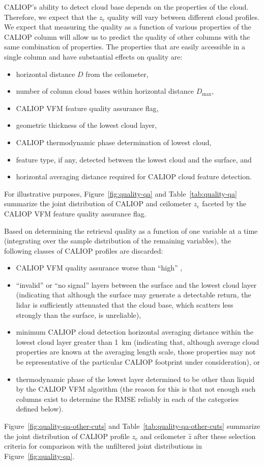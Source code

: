 \documentclass[essd,manuscript]{copernicus}\usepackage[]{graphicx}\usepackage[]{color}
\newcommand\CBHc{\ensuremath{z_\text{c}}}
\begin{document}
CALIOP's ability to detect cloud base depends on the properties of the cloud.
Therefore, we expect that the \CBHc{} quality will vary between
different cloud profiles.  We expect that measuring the quality as a function of various
properties of the CALIOP column will allow us to predict the quality of other
columns with the same combination of properties.  The properties that are easily
accessible in a single column and have substantial effects on quality are:
\begin{itemize}
\item horizontal distance $D$ from the ceilometer,
\item number of column cloud bases within horizontal distance $D_\text{max}$,
\item CALIOP VFM feature quality assurance flag,
\item geometric thickness of the lowest cloud layer,
\item CALIOP thermodynamic phase determination of lowest cloud,
\item feature type, if any, detected between the lowest cloud and the surface, and
\item horizontal averaging distance required for CALIOP cloud feature
  detection.
\end{itemize}
For illustrative purposes, Figure~\ref{fig:quality-qa} and
Table~\ref{tab:quality-qa} summarize the joint distribution of CALIOP and
ceilometer \CBHc{} faceted by the CALIOP VFM feature quality assurance flag.

Based on determining the retrieval quality as a function of one variable at a
time (integrating over the sample distribution of the remaining variables), the
following classes of CALIOP profiles are discarded:
\begin{itemize}
\item CALIOP VFM quality assurance worse than ``high'' ,
\item ``invalid'' or ``no signal'' layers between the surface and the lowest
  cloud layer (indicating that although the surface may generate a detectable
  return, the lidar is sufficiently attenuated that the cloud base, which
  scatters less strongly than the surface, is unreliable),
\item minimum CALIOP cloud detection horizontal averaging distance within the
  lowest cloud layer greater than 1~km (indicating that, although average cloud
  properties are known at the averaging length scale, those properties may not
  be representative of the particular CALIOP footprint under consideration), or
\item thermodynamic phase of the lowest layer determined to be other than liquid
  by the CALIOP VFM algorithm (the reason for this is that not enough such
  columns exist to determine the RMSE reliably in each of the categories defined
  below).
\end{itemize}
Figure~\ref{fig:quality-qa-other-cuts} and Table~\ref{tab:quality-qa-other-cuts}
summarize the joint distribution of CALIOP profile \CBHc{} and ceilometer
$\hat{z}$ after these selection criteria for comparison with the unfiltered
joint distributions in Figure~\ref{fig:quality-qa}.
\end{document}

